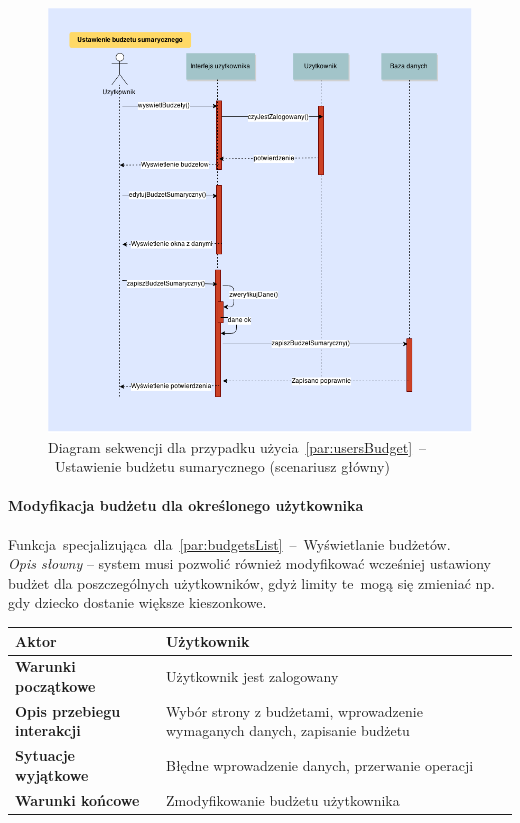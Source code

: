 \begin{figure}[H]
  \includegraphics[width=\textwidth]{images/modyfikacja_budzetu_sumarycznego.png}
  \caption{Diagram sekwencji dla przypadku użycia~\ref{par:usersBudget}~--~Ustawienie budżetu sumarycznego (scenariusz główny)}
\end{figure}

\paragraph{Modyfikacja budżetu dla określonego użytkownika\newline}
\label{par:userBudgetEdit}
Funkcja~specjalizująca~dla~\ref{par:budgetsList}~--~Wyświetlanie budżetów.\\

\textit{Opis słowny} -- system musi pozwolić również modyfikować wcześniej ustawiony budżet dla poszczególnych użytkowników, gdyż limity te~mogą się zmieniać np. gdy dziecko dostanie większe kieszonkowe.

\begin{longtable}{|p{5cm}|p{7cm}|}
  \hline \textbf{Aktor} & Użytkownik \\
  \hline \textbf{Warunki początkowe} & Użytkownik jest zalogowany \\
  \hline \textbf{Opis przebiegu interakcji} & Wybór strony z budżetami, wprowadzenie wymaganych danych, zapisanie budżetu \\
  \hline \textbf{Sytuacje wyjątkowe} & Błędne wprowadzenie danych, przerwanie operacji \\
  \hline \textbf{Warunki końcowe} & Zmodyfikowanie budżetu użytkownika \\
  \hline
\end{longtable}

